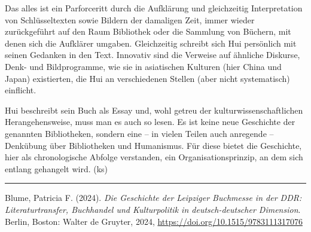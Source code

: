 \documentclass[a4paper,
fontsize=11pt,
oneside,
numbers=noperiodatend,
parskip=half-,
bibliography=totoc,
final
]{scrartcl}
\begin{document}
Das alles ist ein Parforceritt durch die Aufklärung und gleichzeitig
Interpretation von Schlüsseltexten sowie Bildern der damaligen Zeit,
immer wieder zurückgeführt auf den Raum Bibliothek oder die Sammlung von
Büchern, mit denen sich die Aufklärer umgaben. Gleichzeitig schreibt
sich Hui persönlich mit seinen Gedanken in den Text. Innovativ sind die
Verweise auf ähnliche Diskurse, Denk- und Bildprogramme, wie sie in
asiatischen Kulturen (hier China und Japan) existierten, die Hui an
verschiedenen Stellen (aber nicht systematisch) einflicht.

Hui beschreibt sein Buch als Essay und, wohl getreu der
kulturwissenschaftlichen Herangehensweise, muss man es auch so lesen. Es
ist keine neue Geschichte der genannten Bibliotheken, sondern eine -- in
vielen Teilen auch anregende -- Denkübung über Bibliotheken und
Humanismus. Für diese bietet die Geschichte, hier als chronologische
Abfolge verstanden, ein Organisationsprinzip, an dem sich entlang
gehangelt wird. (ks)

\begin{center}\rule{0.5\linewidth}{0.5pt}\end{center}

Blume, Patricia F. (2024). \emph{Die Geschichte der Leipziger Buchmesse
in der DDR: Literaturtransfer, Buchhandel und Kulturpolitik in
deutsch-deutscher Dimension}. Berlin, Boston: Walter de Gruyter, 2024,
\url{https://doi.org/10.1515/9783111317076}
\end{document}
